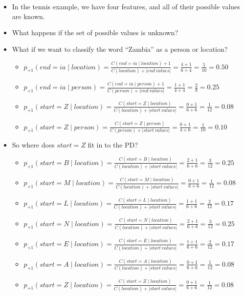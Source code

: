 \documentclass[11pt,letterpaper]{article}
\begin{document}
\begin{itemize}
  \item In the tennis example, we have four features, and all of their possible values are known.
  \item What happens if the set of possible values is unknown?
  \item What if we want to classify the word ``Zambia'' as a person or location?
    \begin{itemize}
      \item $p_{+1}(end=ia \mid location) = \frac{C(end=ia \mid location) + 1}{C(location) + |end~values|} = \frac{4+1}{6+4} = \frac{5}{10} = 0.50$
      \item $p_{+1}(end=ia \mid person) = \frac{C(end=ia \mid person) + 1}{C(person) + |end~values|} = \frac{1+1}{4+4} = \frac{2}{8} = 0.25$
      \\
      \item $p_{+1}(start=Z \mid location) = \frac{C(start=Z \mid location)}{C(location) + |start~values|} = \frac{0+1}{6+6} = \frac{1}{12} = 0.08$
      \item $p_{+1}(start=Z \mid person) = \frac{C(start=Z \mid person)}{C(person) + |start~values|} = \frac{0+1}{4+6} = \frac{1}{10} = 0.10$
    \end{itemize}
  \item So where does $start=Z$ fit in to the PD?
    \begin{itemize}
      \item $p_{+1}(start=B \mid location) = \frac{C(start=B \mid location)}{C(location) + |start~values|} = \frac{2+1}{6+6} = \frac{3}{12} = 0.25$
      \item $p_{+1}(start=M \mid location) = \frac{C(start=M \mid location)}{C(location) + |start~values|} = \frac{0+1}{6+6} = \frac{1}{12} = 0.08$
      \item $p_{+1}(start=L \mid location) = \frac{C(start=L \mid location)}{C(location) + |start~values|} = \frac{1+1}{6+6} = \frac{2}{12} = 0.17$
      \item $p_{+1}(start=N \mid location) = \frac{C(start=N \mid location)}{C(location) + |start~values|} = \frac{2+1}{6+6} = \frac{3}{12} = 0.25$
      \item $p_{+1}(start=E \mid location) = \frac{C(start=E \mid location)}{C(location) + |start~values|} = \frac{1+1}{6+6} = \frac{2}{12} = 0.17$
      \item $p_{+1}(start=A \mid location) = \frac{C(start=A \mid location)}{C(location) + |start~values|} = \frac{0+1}{6+6} = \frac{1}{12} = 0.08$
      \item $p_{+1}(start=Z \mid location) = \frac{C(start=Z \mid location)}{C(location) + |start~values|} = \frac{0+1}{6+6} = \frac{1}{12} = 0.08$


\end{itemize}
\end{itemize}
\end{document}

